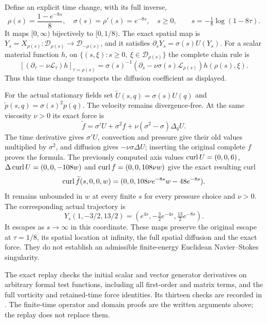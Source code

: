 Define an explicit time change, with its full inverse,
\[
 \rho(s)=\frac{1-e^{-8s}}8,\quad \sigma(s)=\rho'(s)=e^{-8s},
 \quad s\ge0,\qquad s=-\tfrac18\log(1-8\tau).
\]
It maps $[0,\infty)$ bijectively to $[0,1/8)$. The exact spatial map is
$Y_s=X_{\rho(s)}:\mathcal D_{\rho(s)}\to\mathcal D_{-\rho(s)}$,
and it satisfies $\partial_sY_s=\sigma(s)U(Y_s)$.
For a scalar material function $h$, on
$\{(s,\xi):s\ge0,\ \xi\in\mathcal D_{\rho(s)}\}$ the complete chain rule is
\[
 [(\partial_\tau-\nu\mathcal L_\tau)h]_{\tau=\rho(s)}
 =\sigma(s)^{-1}
  (\partial_s-\nu\sigma(s)\mathcal L_{\rho(s)})h(\rho(s),\xi).
\]
Thus this time change transports the diffusion coefficient as displayed.

For the actual stationary fields set
$\widetilde U(s,q)=\sigma(s)U(q)$ and
$\widetilde p(s,q)=\sigma(s)^2p(q)$.
The velocity remains divergence-free. At the same viscosity $\nu>0$
its exact force is
\begin{equation}\label{eq:mg-time-force}
 \widetilde f=\sigma' U+\sigma^2f
                         +\nu(\sigma^2-\sigma)\Delta_qU.
\end{equation}
The time derivative gives $\sigma'U$, convection and pressure give
their old values multiplied by $\sigma^2$, and diffusion gives
$-\nu\sigma\Delta U$; inserting the original complete $f$ proves the
formula. The previously computed axis values
$\operatorname{curl} U=(0,0,6)$, $\Delta\operatorname{curl} U=(0,0,-108w)$ and
$\operatorname{curl} f=(0,0,108\nu w)$ give the exact resulting curl
\[
 \operatorname{curl}\widetilde f(s,0,0,w)
 =(0,0,108\nu e^{-8s}w-48e^{-8s}).
\]
It remains unbounded in $w$ at every finite $s$ for every pressure
choice and $\nu>0$. The corresponding actual trajectory is
\[
 Y_s(1,-3/2,13/2)
 =(e^{4s},-\tfrac32e^{-4s},\tfrac{13}{2}e^{-8s}).
\]
It escapes as $s\to\infty$ in this coordinate. These maps preserve
the original escape at $\tau=1/8$, its spatial location at infinity,
the full spatial diffusion and the exact force. They do not establish
an admissible finite-energy Euclidean Navier--Stokes singularity.

The exact replay  checks the
initial scalar and vector generator derivatives on arbitrary formal
test functions, including all first-order and matrix terms, and the
full vorticity and retained-time force identities. Its thirteen checks
are recorded in .
The finite-time operator and domain proofs are the written arguments
above; the replay does not replace them.
